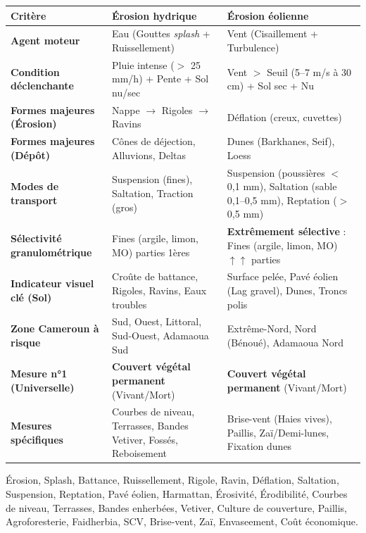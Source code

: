 \documentclass[11pt]{article}
\newcommand{\cle}[1]{{\popxbold\color{popdark}#1}}
\begin{document}
\begin{aretenir}
\begin{center}
\begin{tabularx}{\linewidth}{|l|X|X|}
\hline
\textbf{Critère} & \textbf{Érosion hydrique} & \textbf{Érosion éolienne} \\ \hline
\textbf{Agent moteur} & Eau (Gouttes \emph{splash} + Ruissellement) & Vent (Cisaillement + Turbulence) \\ \hline
\textbf{Condition déclenchante} & Pluie intense ($>$ 25 mm/h) + Pente + Sol nu/sec & Vent $>$ Seuil (5--7 m/s à 30 cm) + Sol sec + Nu \\ \hline
\textbf{Formes majeures (Érosion)} & Nappe $\rightarrow$ Rigoles $\rightarrow$ Ravins & Déflation (creux, cuvettes) \\ \hline
\textbf{Formes majeures (Dépôt)} & Cônes de déjection, Alluvions, Deltas & Dunes (Barkhanes, Seif), Loess \\ \hline
\textbf{Modes de transport} & Suspension (fines), Saltation, Traction (gros) & Suspension (poussières $<$ 0,1 mm), Saltation (sable 0,1--0,5 mm), Reptation ($>$ 0,5 mm) \\ \hline
\textbf{Sélectivité granulométrique} & Fines (argile, limon, MO) parties 1ères & \textbf{Extrêmement sélective} : Fines (argile, limon, MO) $\uparrow\uparrow$ parties \\ \hline
\textbf{Indicateur visuel clé (Sol)} & Croûte de battance, Rigoles, Ravins, Eaux troubles & Surface pelée, Pavé éolien (Lag gravel), Dunes, Troncs polis \\ \hline
\textbf{Zone Cameroun à risque} & Sud, Ouest, Littoral, Sud-Ouest, Adamaoua Sud & Extrême-Nord, Nord (Bénoué), Adamaoua Nord \\ \hline
\textbf{Mesure n°1 (Universelle)} & \textbf{Couvert végétal permanent} (Vivant/Mort) & \textbf{Couvert végétal permanent} (Vivant/Mort) \\ \hline
\textbf{Mesures spécifiques} & Courbes de niveau, Terrasses, Bandes Vetiver, Fossés, Reboisement & Brise-vent (Haies vives), Paillis, Zaï/Demi-lunes, Fixation dunes \\ \hline
\end{tabularx}
\end{center}
\end{aretenir}

\begin{aretenir}
\cle{Érosion}, \cle{Splash}, \cle{Battance}, \cle{Ruissellement}, \cle{Rigole}, \cle{Ravin}, \cle{Déflation}, \cle{Saltation}, \cle{Suspension}, \cle{Reptation}, \cle{Pavé éolien}, \cle{Harmattan}, \cle{Érosivité}, \cle{Érodibilité}, \cle{Courbes de niveau}, \cle{Terrasses}, \cle{Bandes enherbées}, \cle{Vetiver}, \cle{Culture de couverture}, \cle{Paillis}, \cle{Agroforesterie}, \cle{Faidherbia}, \cle{SCV}, \cle{Brise-vent}, \cle{Zaï}, \cle{Envaseement}, \cle{Coût économique}.
\end{aretenir}
\end{document}

